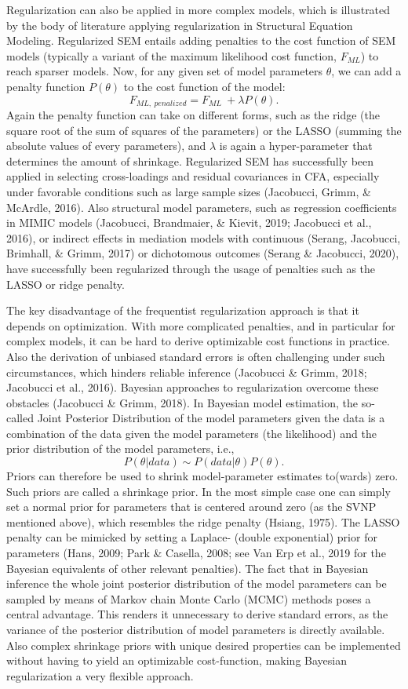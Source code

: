 \documentclass[
  man, donotrepeattitle,floatsintext]{apa6}
\begin{document}
Regularization can also be applied in more complex models, which is illustrated by the body of literature applying regularization in Structural Equation Modeling. Regularized SEM entails adding penalties to the cost function of SEM models (typically a variant of the maximum likelihood cost function, \(F_{ML}\)) to reach sparser models. Now, for any given set of model parameters \(\theta\), we can add a penalty function \(P(\theta)\) to the cost function of the model:
\[F_{ML, \ penalized} = F_{ML} \ + \lambda P(\theta).\]
Again the penalty function can take on different forms, such as the ridge (the square root of the sum of squares of the parameters) or the LASSO (summing the absolute values of every parameters), and \(\lambda\) is again a hyper-parameter that determines the amount of shrinkage. Regularized SEM has successfully been applied in selecting cross-loadings and residual covariances in CFA, especially under favorable conditions such as large sample sizes (Jacobucci, Grimm, \& McArdle, 2016). Also structural model parameters, such as regression coefficients in MIMIC models (Jacobucci, Brandmaier, \& Kievit, 2019; Jacobucci et al., 2016), or indirect effects in mediation models with continuous (Serang, Jacobucci, Brimhall, \& Grimm, 2017) or dichotomous outcomes (Serang \& Jacobucci, 2020), have successfully been regularized through the usage of penalties such as the LASSO or ridge penalty.

The key disadvantage of the frequentist regularization approach is that it depends on optimization. With more complicated penalties, and in particular for complex models, it can be hard to derive optimizable cost functions in practice. Also the derivation of unbiased standard errors is often challenging under such circumstances, which hinders reliable inference (Jacobucci \& Grimm, 2018; Jacobucci et al., 2016). Bayesian approaches to regularization overcome these obstacles (Jacobucci \& Grimm, 2018). In Bayesian model estimation, the so-called Joint Posterior Distribution of the model parameters given the data is a combination of the data given the model parameters (the likelihood) and the prior distribution of the model parameters, i.e.,
\[P({\theta} | data) \sim  P(data | \theta) P(\theta) .\]
Priors can therefore be used to shrink model-parameter estimates to(wards) zero. Such priors are called a shrinkage prior. In the most simple case one can simply set a normal prior for parameters that is centered around zero (as the SVNP mentioned above), which resembles the ridge penalty (Hsiang, 1975). The LASSO penalty can be mimicked by setting a Laplace- (double exponential) prior for parameters (Hans, 2009; Park \& Casella, 2008; see Van Erp et al., 2019 for the Bayesian equivalents of other relevant penalties). The fact that in Bayesian inference the whole joint posterior distribution of the model parameters can be sampled by means of Markov chain Monte Carlo (MCMC) methods poses a central advantage. This renders it unnecessary to derive standard errors, as the variance of the posterior distribution of model parameters is directly available. Also complex shrinkage priors with unique desired properties can be implemented without having to yield an optimizable cost-function, making Bayesian regularization a very flexible approach.
\end{document}
